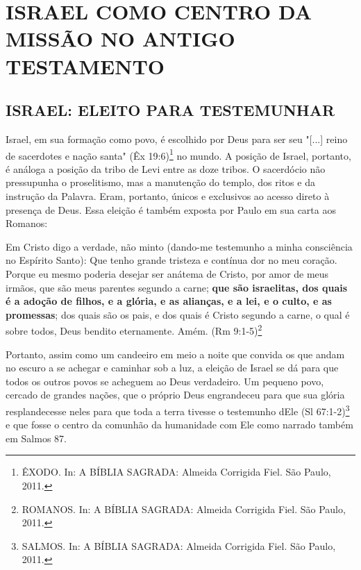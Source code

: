 \documentclass[
    article,            %
	12pt,				%
	oneside,			%
	a4paper,			%
	chapter=TITLE,		%
	section=TITLE,		%
	english,			%
	french,				%
	spanish,			%
	brazil				%
	]{abntex2}
\begin{document}
\section{ISRAEL COMO CENTRO DA MISSÃO NO ANTIGO TESTAMENTO}
\subsection{ISRAEL: ELEITO PARA TESTEMUNHAR}
Israel, em sua formação como povo, é escolhido por Deus para ser seu "[...] reino de sacerdotes e nação santa" (Êx 19:6)\footnote{ÊXODO. In: A BÍBLIA SAGRADA: Almeida Corrigida Fiel. São Paulo, 2011.} no mundo. A posição de Israel, portanto, é análoga a posição da tribo de Levi entre as doze tribos. O sacerdócio não pressupunha o proselitismo, mas a manutenção do templo, dos ritos e da instrução da Palavra. Eram, portanto, únicos e exclusivos ao acesso direto à presença de Deus. Essa eleição é também exposta por Paulo em sua carta aos Romanos:
\begin{citacao}
Em Cristo digo a verdade, não minto (dando-me testemunho a minha consciência no Espírito Santo): Que tenho grande tristeza e contínua dor no meu coração. Porque eu mesmo poderia desejar ser anátema de Cristo, por amor de meus irmãos, que são meus parentes segundo a carne; \textbf{que são israelitas, dos quais é a adoção de filhos, e a glória, e as alianças, e a lei, e o culto, e as promessas}; dos quais são os pais, e dos quais é Cristo segundo a carne, o qual é sobre todos, Deus bendito eternamente. Amém. (Rm 9:1-5)\footnote{ROMANOS. In: A BÍBLIA SAGRADA: Almeida Corrigida Fiel. São Paulo, 2011.}
\end{citacao}
Portanto, assim como um candeeiro em meio a noite que convida os que andam no escuro a se achegar e caminhar sob a luz, a eleição de Israel se dá para que todos os outros povos se acheguem ao Deus verdadeiro. Um pequeno povo, cercado de grandes nações, que o próprio Deus engrandeceu para que sua glória resplandecesse neles para que toda a terra tivesse o testemunho dEle (Sl 67:1-2)\footnote{SALMOS. In: A BÍBLIA SAGRADA: Almeida Corrigida Fiel. São Paulo, 2011.} e que fosse o centro da comunhão da humanidade com Ele como narrado também em Salmos 87.
\end{document}

